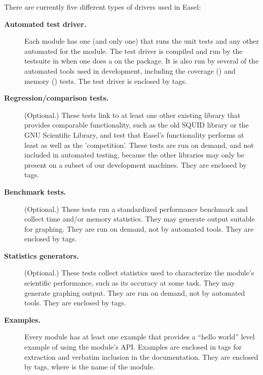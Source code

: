 There are currently five different types of drivers used in Easel:

\begin{description} 

\item[\textbf{Automated test driver.}] Each module has one (and only
  one)  that runs the unit tests and any other automated
  for the module. The test driver is compiled and run by the testsuite
  in  when one does a  on the package. It is also run by several of the automated
  tools used in development, including the coverage () and
  memory () tests.  The test driver is enclosed by
   tags.

\item[\textbf{Regression/comparison tests.}] (Optional.) These tests
  link to at least one other existing library that provides comparable
  functionality, such as the old SQUID library or the GNU Scientific
  Library, and test that Easel's functionality performs at least as
  well as the 'competition'. These tests are run on demand, and not
  included in automated testing, because the other libraries may only
  be present on a subset of our development machines. They are
  enclosed by  tags.

\item[\textbf{Benchmark tests.}] (Optional.) These tests run a
  standardized performance benchmark and collect time and/or memory
  statistics. They may generate output suitable for graphing. They are
  run on demand, not by automated tools. They are enclosed by
   tags.

\item[\textbf{Statistics generators.}] (Optional.) These tests collect
  statistics used to characterize the module's scientific performance,
  such as its accuracy at some task. They may generate graphing
  output. They are run on demand, not by automated tools. They are
  enclosed by  tags.

\item[\textbf{Examples.}] Every module has at least one example
   that provides a ``hello world'' level example of
  using the module's API. Examples are enclosed in 
  tags for extraction and verbatim inclusion in the documentation.
  They are enclosed by  tags, where
   is the name of the module.
\end{description}  


